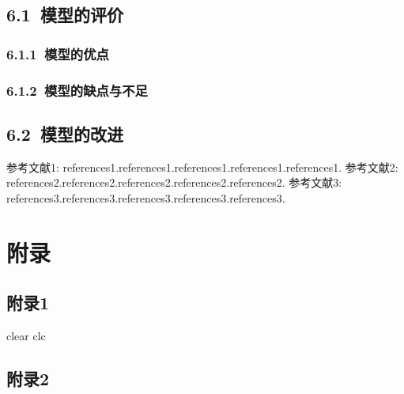 \documentclass[12pt,a4paper]{article}
\begin{document}
\subsection*{6.1\ 模型的评价}
\subsubsection*{6.1.1\ 模型的优点}
\subsubsection*{6.1.2\ 模型的缺点与不足}
\subsection*{6.2\ 模型的改进}

\newpage
\centering
\begin{thebibliography}{99}
	参考文献1: references1.references1.references1.references1.references1.
	参考文献2: references2.references2.references2.references2.references2.
	参考文献3: references3.references3.references3.references3.references3.
\end{thebibliography}

\newpage


\section*{附录}
\begin{flushleft}
\subsection*{附录1}
{\small
clear
clc
}
\end{flushleft}

\begin{flushleft}
\subsection*{附录2}	
\end{flushleft}

\end{document}
